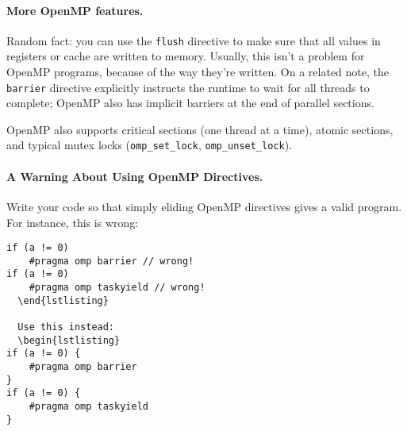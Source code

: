 \paragraph{More OpenMP features.} 
Random fact: you can use the {\tt flush} directive to make sure that
all values in registers or cache are written to memory. Usually, this
isn't a problem for OpenMP programs, because of the way they're
written. On a related note, the {\tt barrier} directive explicitly
instructs the runtime to wait for all threads to complete; OpenMP also
has implicit barriers at the end of parallel sections.  

OpenMP also supports critical sections (one thread at a time), atomic
sections, and typical mutex locks (\verb+omp_set_lock+,
\verb+omp_unset_lock+).

\paragraph{A Warning About Using OpenMP Directives.}
  Write your code so that simply eliding OpenMP directives gives a valid program. For instance, this is wrong:
  \begin{verbatim}
if (a != 0)
    #pragma omp barrier // wrong!
if (a != 0)
    #pragma omp taskyield // wrong!
  \end{lstlisting}

  Use this instead:
  \begin{lstlisting}
if (a != 0) {
    #pragma omp barrier
}
if (a != 0) {
    #pragma omp taskyield
}
  \end{verbatim}






